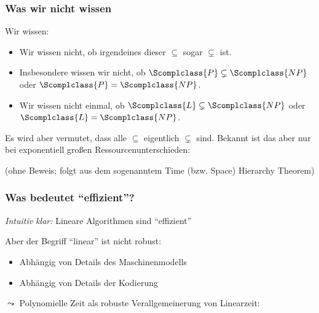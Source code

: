 \documentclass[aspectratio=1610,onlymath]{beamer}
\begin{document}
\begin{frame}\frametitle{Was wir nicht wissen}

Wir wissen:

\theobox{
\[\Scomplclass{L}\subseteq\Scomplclass{NL}\subseteq \Scomplclass{P}\subseteq\Scomplclass{NP}\subseteq\Scomplclass{PSpace}= \Scomplclass{NPSpace}\subseteq \Scomplclass{Exp}\subseteq \Scomplclass{NExp}\]
\vspace{-2.5ex}
}

\begin{itemize}
\item Wir wissen nicht, ob irgendeines dieser $\subseteq$ sogar $\subsetneq$ ist.
\item Insbesondere wissen wir nicht, ob $\Scomplclass{P}\subsetneq\Scomplclass{NP}$ oder $\Scomplclass{P}=\Scomplclass{NP}$.
\item Wir wissen nicht einmal, ob $\Scomplclass{L}\subsetneq\Scomplclass{NP}$ oder $\Scomplclass{L}=\Scomplclass{NP}$.
\end{itemize}\pause
Es wird aber vermutet, dass alle  $\subseteq$ eigentlich $\subsetneq$ sind.
% 
Bekannt ist das aber nur bei exponentiell großen Ressourcenunterschieden:


(ohne Beweis; folgt aus dem sogenanntem \alert{Time (bzw. Space) Hierarchy Theorem})

\end{frame}



\begin{frame}\frametitle{Was bedeutet "`effizient"'?}

\emph{Intuitiv klar:} Lineare Algorithmen sind "`effizient"'
\bigskip\pause

Aber der Begriff "`linear"' ist nicht robust:
\begin{itemize}
\item Abhängig von Details des Maschinenmodells
\item Abhängig von Details der Kodierung
\end{itemize}
\bigskip
$\leadsto$ Polynomielle Zeit als robuste Verallgemeinerung von Linearzeit:\bigskip

%

\end{frame}
\end{document}
